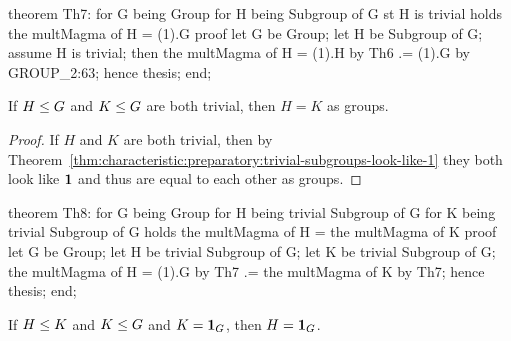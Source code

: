 \nwenddocs{}\endmoddef\nwstartdeflinemarkup{}\nwenddeflinemarkup
theorem Th7:
  for G being Group
  for H being Subgroup of G
  st H is trivial
  holds the multMagma of H = (1).G
proof
  let G be Group;
  let H be Subgroup of G;
  assume H is trivial;
  then the multMagma of H = (1).H by Th6
                         .= (1).G by GROUP_2:63;
  hence thesis;
end;

\eatline
{}\nwendcode{}\nwdocspar
\begin{theorem}
If $H\leq G$ and $K\leq G$ are both trivial, then $H=K$ as groups.
\end{theorem}

\begin{proof}
If $H$ and $K$ are both trivial, then by Theorem~\ref{thm:characteristic:preparatory:trivial-subgroups-look-like-1} they both look like $\mathbf{1}$
and thus are equal to each other as groups.
\end{proof}

\nwenddocs{}\endmoddef\nwstartdeflinemarkup{}\nwenddeflinemarkup
theorem Th8:
  for G being Group
  for H being trivial Subgroup of G
  for K being trivial Subgroup of G
  holds the multMagma of H = the multMagma of K
proof
  let G be Group;
  let H be trivial Subgroup of G;
  let K be trivial Subgroup of G;
  the multMagma of H = (1).G by Th7
                    .= the multMagma of K by Th7;
  hence thesis;
end;
\eatline
{}\nwendcode{}\nwdocspar
\begin{theorem}
If $H\leq K$ and $K\leq G$ and $K=\mathbf{1}_{G}$, then $H=\mathbf{1}_{G}$.
\end{theorem}

